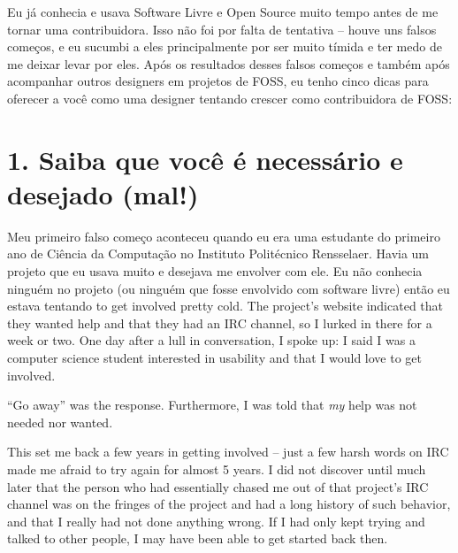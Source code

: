 

\noindent{}Eu já conhecia e usava Software Livre e Open Source muito tempo antes
de me tornar uma contribuidora. Isso não foi por falta de tentativa -- houve uns falsos
começos, e eu sucumbi a eles principalmente por ser muito tímida e ter medo de
me deixar levar por eles. Após os resultados desses falsos começos e também após
acompanhar outros designers em projetos de FOSS, eu tenho cinco dicas para oferecer a você
como uma designer tentando crescer como contribuidora de FOSS:

\section*{1. Saiba que você é necessário e desejado (mal!)}

Meu primeiro falso começo aconteceu quando eu era uma estudante do primeiro ano 
de Ciência da Computação no Instituto Politécnico Rensselaer. Havia um projeto que eu usava
muito e desejava me envolver com ele. Eu não conhecia ninguém no projeto (ou
ninguém que fosse envolvido com software livre) então eu estava tentando to get involved pretty
cold. The project's website indicated that they wanted help and that they had an
IRC channel, so I lurked in there for a week or two. One day after a lull in
conversation, I spoke up: I said I was a computer science student interested in
usability and that I would love to get involved.

``Go away'' was the response. Furthermore, I was told that \emph{my} help was not
needed nor wanted. 

This set me back a few years in getting involved -- just a few harsh words on IRC
made me afraid to try again for almost 5 years.  I did not discover until much
later that the person who had essentially chased me out of that project's IRC
channel was on the fringes of the project and had a long history of such
behavior, and that I really had not done anything wrong. If I had only kept
trying and talked to other people, I may have been able to get started back
then.

